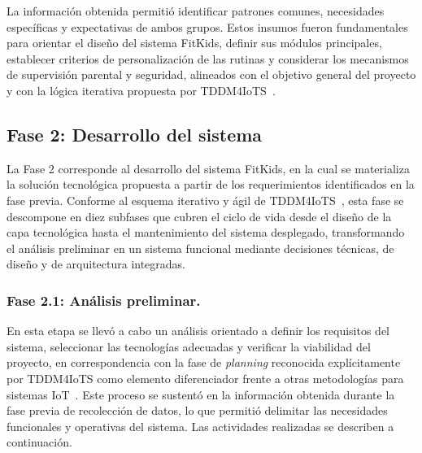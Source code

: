 				La información obtenida permitió identificar patrones comunes, necesidades específicas y expectativas de ambos grupos. Estos insumos fueron fundamentales para orientar el diseño del sistema FitKids, definir sus módulos principales, establecer criterios de personalización de las rutinas y considerar los mecanismos de supervisión parental y seguridad, alineados con el objetivo general del proyecto y con la lógica iterativa propuesta por TDDM4IoTS~\cite{GuerreroUlloa2024,HernandezSampieri2014}.
					
			\subsection{Fase 2: Desarrollo del sistema}
				La Fase 2 corresponde al desarrollo del sistema FitKids, en la cual se materializa la solución tecnológica propuesta a partir de los requerimientos identificados en la fase previa. Conforme al esquema iterativo y ágil de TDDM4IoTS~\cite{GuerreroUlloa2024}, esta fase se descompone en diez subfases que cubren el ciclo de vida desde el diseño de la capa tecnológica hasta el mantenimiento del sistema desplegado, transformando el análisis preliminar en un sistema funcional mediante decisiones técnicas, de diseño y de arquitectura integradas.
					
				\subsubsection{Fase 2.1: Análisis preliminar.}
					En esta etapa se llevó a cabo un análisis orientado a definir los requisitos del sistema, seleccionar las tecnologías adecuadas y verificar la viabilidad del proyecto, en correspondencia con la fase de \textit{planning} reconocida explícitamente por TDDM4IoTS como elemento diferenciador frente a otras metodologías para sistemas IoT~\cite{GuerreroUlloa2024}. Este proceso se sustentó en la información obtenida durante la fase previa de recolección de datos, lo que permitió delimitar las necesidades funcionales y operativas del sistema. Las actividades realizadas se describen a continuación.
					
